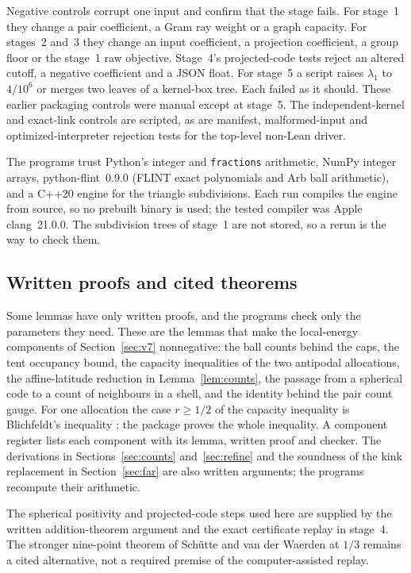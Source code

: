 \documentclass[11pt]{amsart}
\numberwithin{equation}{section}
\theoremstyle{remark}
\begin{document}
Negative controls corrupt one input and confirm that the stage fails. For stage~1 they change a pair coefficient, a Gram ray weight or a graph capacity. For stages~2 and~3 they change an input coefficient, a projection coefficient, a group floor or the stage~1 raw objective. Stage~4's projected-code tests reject an altered cutoff, a negative coefficient and a JSON float. For stage~5 a script raises $\lambda_1$ to $4/10^6$ or merges two leaves of a kernel-box tree. Each failed as it should. These earlier packaging controls were manual except at stage~5. The independent-kernel and exact-link controls are scripted, as are manifest, malformed-input and optimized-interpreter rejection tests for the top-level non-Lean driver.

The programs trust Python's integer and \texttt{fractions} arithmetic, NumPy integer arrays, python-flint~0.9.0 (FLINT exact polynomials and Arb ball arithmetic), and a C++20 engine for the triangle subdivisions. Each run compiles the engine from source, so no prebuilt binary is used; the tested compiler was Apple clang~21.0.0. The subdivision trees of stage~1 are not stored, so a rerun is the way to check them.

\subsection*{Written proofs and cited theorems}
Some lemmas have only written proofs, and the programs check only the parameters they need. These are the lemmas that make the local-energy components of Section~\ref{sec:v7} nonnegative: the ball counts behind the caps, the tent occupancy bound, the capacity inequalities of the two antipodal allocations, the affine-latitude reduction in Lemma~\ref{lem:counts}, the passage from a spherical code to a count of neighbours in a shell, and the identity behind the pair count gauge. For one allocation the case $r\ge1/2$ of the capacity inequality is Blichfeldt's inequality \cite{Blichfeldt}; the package proves the whole inequality. A component register lists each component with its lemma, written proof and checker. The derivations in Sections~\ref{sec:counts} and~\ref{sec:refine} and the soundness of the kink replacement in Section~\ref{sec:far} are also written arguments; the programs recompute their arithmetic.

The spherical positivity and projected-code steps used here are supplied by the written addition-theorem argument and the exact certificate replay in stage~4. The stronger nine-point theorem of Sch\"utte and van der Waerden at $1/3$ remains a cited alternative, not a required premise of the computer-assisted replay.
\end{document}
